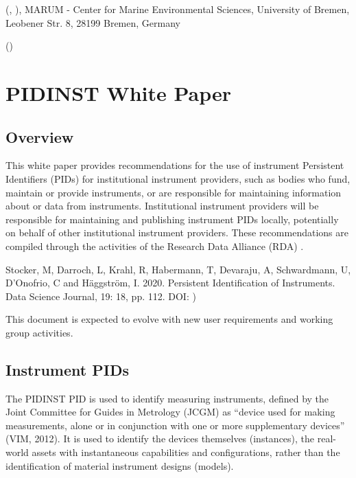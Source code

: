 \documentclass[a4paper,10pt,english]{sphinxmanual}
\begin{document}
 (, ),
MARUM - Center for Marine Environmental Sciences, University of Bremen, Leobener Str. 8, 28199 Bremen, Germany

 ()

\cleardoublepage
\sphinxtableofcontents
\pagestyle{normal}



\chapter{PIDINST White Paper}
\label{\detokenize{white-paper/index:pidinst-white-paper}}\label{\detokenize{white-paper/index:white-paper}}\label{\detokenize{white-paper/index::doc}}


\section{Overview}
\label{\detokenize{white-paper/overview:overview}}\label{\detokenize{white-paper/overview::doc}}
This white paper provides recommendations for the use of instrument
Persistent Identifiers (PIDs) for institutional instrument providers,
such as bodies who fund, maintain or provide instruments, or are
responsible for maintaining information about or data from instruments.
Institutional instrument providers will be responsible for maintaining
and publishing instrument PIDs locally, potentially on behalf of other
institutional instrument providers. These recommendations are compiled
through the activities of the Research Data Alliance (RDA) .%
\begin{footnote}[1]\sphinxAtStartFootnote
Stocker, M, Darroch, L, Krahl, R, Habermann, T, Devaraju, A,
Schwardmann, U, D’Onofrio, C and Häggström, I. 2020. Persistent
Identification of Instruments. Data Science Journal, 19: 18, pp.
1\textendash{}12. DOI: )
%
\end{footnote} This document is expected to evolve with
new user requirements and working group activities.


\section{Instrument PIDs}
\label{\detokenize{white-paper/instrument-pids:instrument-pids}}\label{\detokenize{white-paper/instrument-pids::doc}}
The PIDINST PID is used to identify measuring instruments, defined by
the Joint Committee for Guides in Metrology (JCGM) as “device used for
making measurements, alone or in conjunction with one or more
supplementary devices” (VIM, 2012). It is used to identify the devices
themselves (instances), the real-world assets with instantaneous
capabilities and configurations, rather than the identification of
material instrument designs (models).
\end{document}
